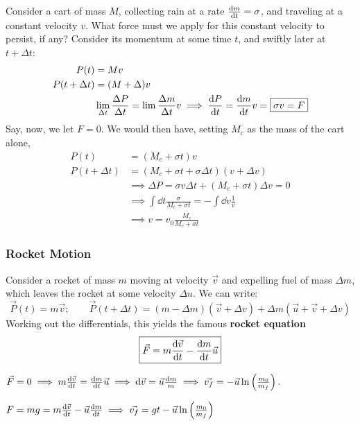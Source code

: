 \documentclass[12pt]{article}
\begin{document}
\begin{example}
  Consider a cart of mass $M$, collecting rain at a rate $\dv{m}{t} = \sigma$, and traveling at a constant velocity $v$. What force must we apply for this constant velocity to persist, if any? Consider its momentum at some time $t$, and swiftly later at $t + \Delta t$:
  \begin{align*}
    P(t) &= Mv\\
    P(t+\Delta t) &= (M+ \Delta)v \\
    & \lim_{\Delta t} \frac{\Delta P}{\Delta t} = \lim \frac{\Delta m}{\Delta t} v \implies \dv{P}{t} = \dv{m}{t}v = \boxed{\sigma v = F}
  \end{align*}
  Say, now, we let $F = 0$. We would then have, setting $M_c$ as the mass of the cart alone, \begin{align*}
    P(t) &= (M_c + \sigma t)v\\
    P(t+\Delta t) & = (M_c + \sigma t + \sigma \Delta t)(v + \Delta v)\\
    &\implies \Delta P = \sigma v \Delta t + (M_c + \sigma t) \Delta v = 0\\
    &\implies\int \dd{t} \frac{\sigma}{M_c + \sigma t} = -\int \dd{v} \frac{1}{v}\\
    &\implies v = v_0 \frac{M_c}{M_c + \sigma t}
  \end{align*}
\end{example}

\subsubsection{Rocket Motion}

Consider a rocket of mass $m$ moving at velocity $\vec{v}$ and expelling fuel of mass $\Delta m$, which leaves the rocket at some velocity $\Delta u$. We can write:
\[\vec{P}(t) = m \vec{v}; \qquad \vec{P}(t+\Delta t) = (m-\Delta m)(\vec{v} + \Delta v)+ \Delta m (\vec{u} + \vec{v} + \Delta v)\] Working out the differentials, this yields the famous \textbf{rocket equation} \begin{align*}
  \boxed{\vec{F} = m \dv{\vec{v}}{t} - \dv{m}{t}\vec{u}}
\end{align*}

\begin{example}
  $\vec{F} = 0 \implies m \dv{\vec{v}}{t} = \dv{m}{t} \vec{u} \implies \dd \vec{v} = \vec{u} \frac{\dd{m}}{m} \implies \vec{v_f} = - \vec{u} \ln \left(\frac{m_0}{m_f}\right).$
\end{example}
\begin{example}
  $F = mg = m \dv{\vec{v}}{t} - \vec{u}\dv{m}{t} \implies \vec{v_f} = gt - \vec{u} \ln \left(\frac{m_0}{m_f}\right)$
\end{example}
\end{document}
